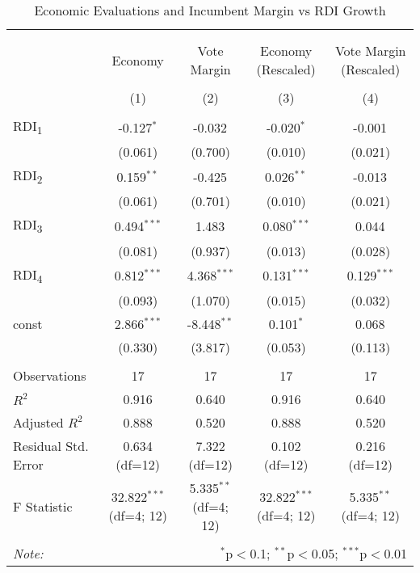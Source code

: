 \begin{table}[!htbp]
\centering
\caption{Economic Evaluations and Incumbent Margin vs RDI Growth}
\begin{tabular}{@{\extracolsep{5pt}}lcccc}
\\[-1.8ex]\hline
\hline \\[-1.8ex]
\\[-1.8ex] & \multicolumn{1}{c}{Economy} & \multicolumn{1}{c}{Vote Margin} & \multicolumn{1}{c}{Economy (Rescaled)} & \multicolumn{1}{c}{Vote Margin (Rescaled)}  \\
\\[-1.8ex] & (1) & (2) & (3) & (4) \\
\hline \\[-1.8ex]
 RDI\textsubscript{1} & -0.127$^{*}$ & -0.032$^{}$ & -0.020$^{*}$ & -0.001$^{}$ \\
& (0.061) & (0.700) & (0.010) & (0.021) \\
 RDI\textsubscript{2} & 0.159$^{**}$ & -0.425$^{}$ & 0.026$^{**}$ & -0.013$^{}$ \\
& (0.061) & (0.701) & (0.010) & (0.021) \\
 RDI\textsubscript{3} & 0.494$^{***}$ & 1.483$^{}$ & 0.080$^{***}$ & 0.044$^{}$ \\
& (0.081) & (0.937) & (0.013) & (0.028) \\
 RDI\textsubscript{4} & 0.812$^{***}$ & 4.368$^{***}$ & 0.131$^{***}$ & 0.129$^{***}$ \\
& (0.093) & (1.070) & (0.015) & (0.032) \\
 const & 2.866$^{***}$ & -8.448$^{**}$ & 0.101$^{*}$ & 0.068$^{}$ \\
& (0.330) & (3.817) & (0.053) & (0.113) \\
\hline \\[-1.8ex]
 Observations & 17 & 17 & 17 & 17 \\
 $R^2$ & 0.916 & 0.640 & 0.916 & 0.640 \\
 Adjusted $R^2$ & 0.888 & 0.520 & 0.888 & 0.520 \\
 Residual Std. Error & 0.634 (df=12) & 7.322 (df=12) & 0.102 (df=12) & 0.216 (df=12) \\
 F Statistic & 32.822$^{***}$ (df=4; 12) & 5.335$^{**}$ (df=4; 12) & 32.822$^{***}$ (df=4; 12) & 5.335$^{**}$ (df=4; 12) \\
\hline
\hline \\[-1.8ex]
\textit{Note:} & \multicolumn{4}{r}{$^{*}$p$<$0.1; $^{**}$p$<$0.05; $^{***}$p$<$0.01} \\
\end{tabular}
\end{table}
